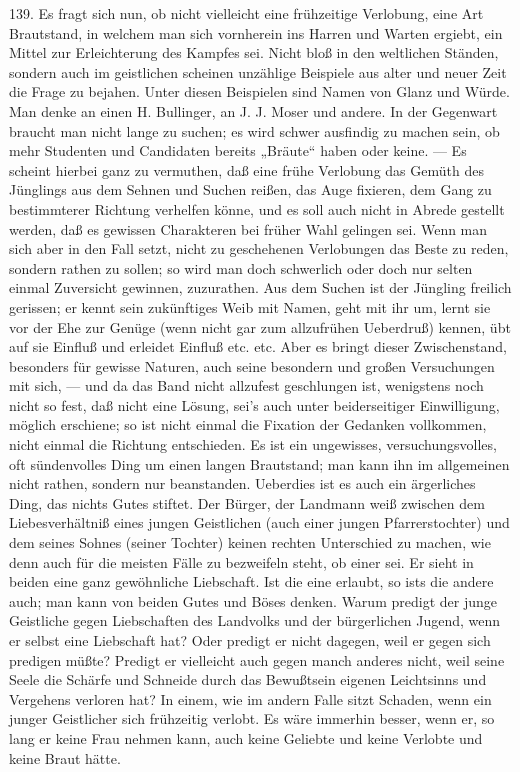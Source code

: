 139. Es fragt sich nun, ob nicht vielleicht eine frühzeitige Verlobung, eine Art Brautstand, in welchem man sich vornherein ins Harren und Warten ergiebt, ein Mittel zur Erleichterung des Kampfes sei. Nicht bloß in den weltlichen Ständen, sondern auch im geistlichen scheinen unzählige Beispiele aus alter und neuer Zeit die Frage zu bejahen. Unter diesen Beispielen sind Namen von Glanz und Würde. Man denke an einen H. Bullinger, an J. J. Moser und andere. In der Gegenwart braucht man nicht lange zu suchen; es wird schwer ausfindig zu machen
sein, ob mehr Studenten und Candidaten bereits „Bräute“ haben oder keine. — Es scheint hierbei ganz zu vermuthen, daß eine frühe Verlobung das Gemüth des Jünglings aus dem Sehnen und Suchen reißen, das Auge fixieren, dem Gang zu bestimmterer Richtung verhelfen könne, und es soll auch nicht in Abrede gestellt werden, daß es gewissen Charakteren bei früher Wahl gelingen sei. Wenn man sich aber in den Fall setzt, nicht zu geschehenen Verlobungen das Beste zu reden, sondern rathen zu sollen; so wird man doch schwerlich oder doch nur selten einmal Zuversicht gewinnen, zuzurathen. Aus dem Suchen ist der Jüngling freilich gerissen; er kennt sein zukünftiges Weib mit Namen, geht mit ihr um, lernt sie vor der Ehe zur Genüge (wenn nicht gar zum allzufrühen Ueberdruß) kennen, übt auf sie Einfluß und erleidet Einfluß etc. etc. Aber es bringt dieser Zwischenstand, besonders für gewisse Naturen, auch seine besondern und großen Versuchungen mit sich, — und da das Band nicht allzufest geschlungen ist, wenigstens noch nicht so fest, daß nicht eine Lösung, sei’s auch unter beiderseitiger Einwilligung, möglich erschiene; so ist nicht einmal die Fixation der Gedanken vollkommen, nicht einmal die Richtung entschieden. Es ist ein ungewisses, versuchungsvolles, oft sündenvolles Ding um einen langen Brautstand; man kann ihn im allgemeinen nicht rathen, sondern nur beanstanden. Ueberdies ist es auch ein ärgerliches Ding, das nichts Gutes stiftet. Der Bürger, der Landmann weiß zwischen dem Liebesverhältniß eines jungen Geistlichen (auch einer jungen Pfarrerstochter) und dem seines Sohnes (seiner Tochter)
keinen rechten Unterschied zu machen, wie denn auch für die meisten Fälle zu bezweifeln steht, ob einer sei. Er sieht in beiden eine ganz gewöhnliche Liebschaft. Ist die eine erlaubt, so ists die andere auch; man kann von beiden Gutes und Böses denken. Warum predigt der junge Geistliche gegen Liebschaften des Landvolks und der bürgerlichen Jugend, wenn er selbst eine Liebschaft hat? Oder predigt er nicht dagegen, weil er gegen sich predigen müßte? Predigt er vielleicht auch gegen manch anderes nicht, weil seine Seele die Schärfe und Schneide durch das Bewußtsein eigenen Leichtsinns und Vergehens verloren hat? In einem, wie im andern Falle sitzt Schaden, wenn ein junger Geistlicher sich frühzeitig verlobt. Es wäre immerhin besser, wenn er, so lang er keine Frau nehmen kann, auch keine Geliebte und keine Verlobte und keine Braut hätte.


